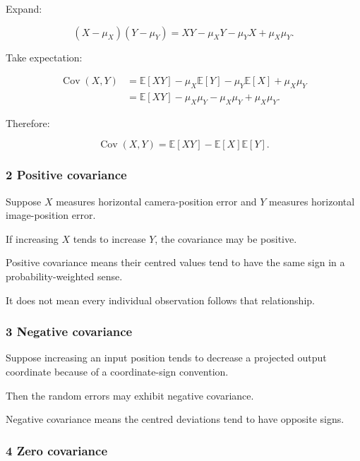 Expand:

\[
 (X-\mu_X)(Y-\mu_Y) = XY-\mu_XY-\mu_YX+\mu_X\mu_Y.
\]

Take expectation:

\[
 \begin{aligned} \operatorname{Cov}(X,Y) &=\mathbb E[XY] -\mu_X\mathbb E[Y] -\mu_Y\mathbb E[X] +\mu_X\mu_Y\\ &=\mathbb E[XY] -\mu_X\mu_Y-\mu_X\mu_Y+\mu_X\mu_Y. \end{aligned}
\]

Therefore:

\[
 \boxed{ \operatorname{Cov}(X,Y) = \mathbb E[XY]-\mathbb E[X]\mathbb E[Y] }.
\]

\subsubsection{2 Positive covariance}\label{02-foundations-ii-ch023-positive-covariance}

\hypertarget{02-foundations-ii-ch023-positive-covariance}{}

Suppose \(X\) measures horizontal camera-position error and \(Y\) measures horizontal image-position error.

If increasing \(X\) tends to increase \(Y\), the covariance may be positive.

Positive covariance means their centred values tend to have the same sign in a probability-weighted sense.

It does not mean every individual observation follows that relationship.

\subsubsection{3 Negative covariance}\label{02-foundations-ii-ch023-negative-covariance}

\hypertarget{02-foundations-ii-ch023-negative-covariance}{}

Suppose increasing an input position tends to decrease a projected output coordinate because of a coordinate-sign convention.

Then the random errors may exhibit negative covariance.

Negative covariance means the centred deviations tend to have opposite signs.

\subsubsection{4 Zero covariance}\label{02-foundations-ii-ch023-zero-covariance}

